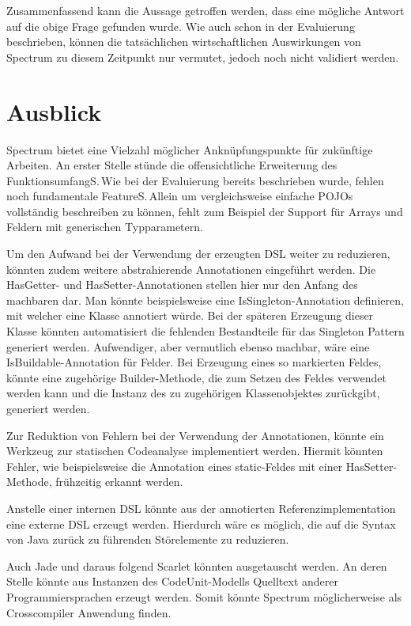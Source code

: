 \documentclass[12pt,oneside,a4paper,parskip]{scrbook}
\begin{document}
Zusammenfassend kann die Aussage getroffen werden, dass eine mögliche Antwort auf die obige Frage gefunden wurde. Wie auch schon in der Evaluierung beschrieben, können die tatsächlichen wirtschaftlichen Auswirkungen von Spectrum zu diesem Zeitpunkt nur vermutet, jedoch noch nicht validiert werden.

\section{Ausblick}

Spectrum bietet eine Vielzahl möglicher Anknüpfungspunkte für zukünftige Arbeiten. An erster Stelle stünde die offensichtliche Erweiterung des FunktionsumfangS.\,Wie bei der Evaluierung bereits beschrieben wurde, fehlen noch fundamentale FeatureS.\,Allein um vergleichsweise einfache POJOs vollständig beschreiben zu können, fehlt zum Beispiel der Support für Arrays und Feldern mit generischen Typparametern.

Um den Aufwand bei der Verwendung der erzeugten DSL weiter zu reduzieren, könnten zudem weitere abstrahierende Annotationen eingeführt werden. Die HasGetter- und HasSetter-Annotationen stellen hier nur den Anfang des machbaren dar. Man könnte beispielsweise eine IsSingleton-Annotation definieren, mit welcher eine Klasse annotiert würde. Bei der späteren Erzeugung dieser Klasse könnten automatisiert die fehlenden Bestandteile für das Singleton Pattern generiert werden. Aufwendiger, aber vermutlich ebenso machbar, wäre eine IsBuildable-Annotation für Felder. Bei Erzeugung eines so markierten Feldes, könnte eine zugehörige Builder-Methode, die zum Setzen des Feldes verwendet werden kann und die Instanz des zu zugehörigen Klassenobjektes zurückgibt, generiert werden.

Zur Reduktion von Fehlern bei der Verwendung der Annotationen, könnte ein Werkzeug zur statischen Codeanalyse implementiert werden. Hiermit könnten Fehler, wie beispielsweise die Annotation eines static-Feldes mit einer HasSetter-Methode, frühzeitig erkannt werden.

Anstelle einer internen DSL könnte aus der annotierten Referenzimplementation eine externe DSL erzeugt werden. Hierdurch wäre es möglich, die auf die Syntax von Java zurück zu führenden Störelemente zu reduzieren.

Auch Jade und daraus folgend Scarlet könnten ausgetauscht werden. An deren Stelle könnte aus Instanzen des CodeUnit-Modells Quelltext anderer Programmiersprachen erzeugt werden. Somit könnte Spectrum möglicherweise als Crosscompiler Anwendung finden.
\end{document}
